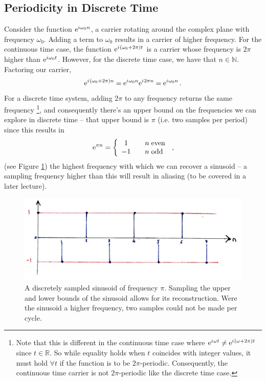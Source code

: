 \subsection{Periodicity in Discrete Time}
%
Consider the function $\mathrm{e}^{{i\mkern1mu}\omega_0 n}$, a carrier rotating around the
complex plane with frequency $\omega_0$. Adding a term to $\omega_0$ results in
a carrier of higher frequency. For the continuous time case, the function
$\mathrm{e}^{{i\mkern1mu}(\omega_0 + 2\pi)t}$ is a carrier whose frequency is $2\pi$ higher
than $\mathrm{e}^{{i\mkern1mu}\omega_0 t}$. However, for the discrete time case, we have that
$n\in\mathbb{N}$. Factoring our carrier,
%
\begin{displaymath}
  \mathrm{e}^{{i\mkern1mu}(\omega_0 + 2\pi)n} = \mathrm{e}^{{i\mkern1mu}\omega_0n}\mathrm{e}^{{i\mkern1mu} 2\pi n} = \mathrm{e}^{{i\mkern1mu}\omega_0n} \,.
\end{displaymath}
%
For a discrete time system, adding $2\pi$ to any frequency returns the same frequency
\footnote{
  Note that this is different in the continuous time case where
  $\mathrm{e}^{{i\mkern1mu}\omega t} \neq \mathrm{e}^{{i\mkern1mu}(\omega + 2\pi)t}$ since $t\in\mathbb{R}$. So while equality
  holds when $t$ coincides with integer values, it must hold $\forall t$ if the function is to
  be $2\pi$-periodic. Consequently, the continuous time carrier is not $2\pi$-periodic like
  the discrete time case.
}, and consequently there's an upper bound on the frequencies we can explore in discrete
time -- that upper bound is $\pi$ (i.e. two samples per period) since this results in
%
\begin{displaymath}
  \mathrm{e}^{\pi n} = \left\{\begin{array}{ccl}
  1 & & n\hspace{1mm}\mathrm{even} \\
  -1 & & n\hspace{1mm}\mathrm{odd} \\
  \end{array}\right. \,,
\end{displaymath}
%
(see Figure \ref{fig::lecture_1_discrete_sampling}) the highest frequency with which we can recover
a sinusoid -- a sampling frequency higher than this will result in aliasing (to be covered in a
later lecture). 
%
\begin{figure}[H]
  \includegraphics[width=\textwidth]{images/lecture_1_discrete_sampling.JPG}
  \caption{
    A discretely sampled sinusoid of frequency $\pi$. Sampling the upper and lower bounds of
    the sinusoid allows for its reconstruction. Were the sinusoid a higher frequency, two samples
    could not be made per cycle.
  }
  \label{fig::lecture_1_discrete_sampling}
\end{figure}
